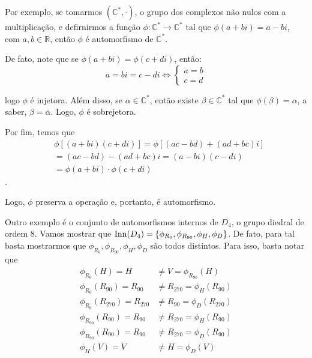 	\par\vspace{0.3cm} Por exemplo, se tomarmos $(\mathbb{C^{*}}, \cdot)$, o grupo dos complexos não nulos com a multiplicação, e defirnirmos a função $\phi : \mathbb{C^{*}}\to\mathbb{C^{*}}$ tal que $\phi(a+bi) = a-bi$, com $a,b\in\mathbb{R}$, então $\phi$ é automorfismo de $\mathbb{C^{*}}$. 
	\par\vspace{0.3cm} De fato, note que se $\phi(a+bi) = \phi(c+di)$, então:
	\begin{equation*}
	a = bi = c - di \Leftrightarrow \begin{cases}a = b \\ c = d\end{cases}
	\end{equation*}
	\par\vspace{0.3cm} logo $\phi$ é injetora.  Além disso, se $\alpha\in\mathbb{C^{*}}$, então existe $\beta\in\mathbb{C^{*}}$ tal que $\phi(\beta) = \alpha$, a saber, $\beta = \overline{\alpha}$. Logo, $\phi$ é sobrejetora. 
	\par\vspace{0.3cm} Por fim, temos que 
	\begin{align*}
	&\phi[(a + bi)(c + di)] = \phi[(ac - bd) + (ad + bc)i] \\ &= (ac - bd) - (ad + bc)i = (a- bi)(c - di) \\ &= \phi(a + bi)\cdot\phi(c + di)
	\end{align*}.
	\par\vspace{0.3cm} Logo, $\phi$ preserva a operação e, portanto, é automorfismo.
	\par\vspace{0.3cm} Outro exemplo é o conjunto de automorfismos internos de $D_4$, o grupo diedral de ordem $8$. Vamos mostrar que $\operatorname{Inn}(D_4) = \displaystyle{ \left\{ \phi_{R_0}, \phi_{R_{90}}, \phi_{H}, \phi_{D} \right\} }$. De fato, para tal basta mostrarmos que $\phi_{R_0}, \phi_{R_{90}}, \phi_{H}, \phi_{D}$ são todos distintos. Para isso, basta notar que
	\begin{align*}
	\phi_{R_{0}}(H) = H &\neq V = \phi_{R_{90}}(H) \\
	\phi_{R_{0}}(R_{90}) = R_{90} &\neq R_{270} = \phi_{H}(R_{90}) \\
	\phi_{R_{0}}(R_{270}) = R_{270} &\neq R_{90} = \phi_{D}(R_{270}) \\
	\phi_{R_{90}}(R_{90}) = R_{90} &\neq R_{270} = \phi_{H}(R_{90}) \\
	\phi_{R_{90}}(R_{90}) = R_{90} &\neq R_{270} = \phi_{D}(R_{90}) \\
	\phi_{H}(V) = V &\neq H = \phi_{D}(V)
	\end{align*}

